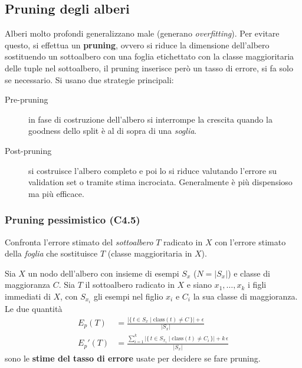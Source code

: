 \subsection{Pruning degli alberi}\label{subsec:pruning}
Alberi molto profondi generalizzano male (generano \emph{overfitting}). Per evitare questo, si effettua un \textbf{pruning}, ovvero si riduce la dimensione dell'albero sostituendo un sottoalbero con una foglia etichettato con la classe maggioritaria delle tuple nel sottoalbero, il pruning inserisce però un tasso di errore, si fa solo se necessario. Si usano due strategie principali:
\begin{description}
  \item[Pre-pruning] in fase di costruzione dell'albero si interrompe la crescita quando la goodness dello split è al di sopra di una \emph{soglia}.
  \item[Post-pruning] si costruisce l'albero completo e poi lo si riduce valutando l'errore su validation set o tramite stima incrociata. Generalmente è più dispensioso ma più efficace.
\end{description}

\subsubsection*{Pruning pessimistico (C4.5)}
Confronta l’errore stimato del \emph{sottoalbero} $T$ radicato in $X$ con l’errore stimato della \emph{foglia} che sostituisce $T$ (classe maggioritaria in $X$).

Sia \(X\) un nodo dell’albero con insieme di esempi \(S_x\) (\(N=|S_x|\)) e classe di maggioranza \(C\).
Sia \(T\) il sottoalbero radicato in \(X\) e siano \(x_1,\dots,x_k\) i figli immediati di \(X\), con
\(S_{x_i}\) gli esempi nel figlio \(x_i\) e \(C_i\) la sua classe di maggioranza. Le due quantità
\[
\begin{aligned}
E_p(T)   &= \frac{\bigl|\{\, t \in S_x \mid \mathrm{class}(t) \neq C \,\}\bigr| + \epsilon}{\lvert S_x\rvert}\\[4pt]
E_p'(T) &= \frac{\displaystyle \sum_{i=1}^{k} \bigl|\{\, t \in S_{x_i} \mid \mathrm{class}(t) \neq C_i \,\}\bigr| + k\,\epsilon}{\lvert S_x\rvert}
\end{aligned}
\]
sono le \textbf{stime del tasso di errore} usate per decidere se fare pruning.

